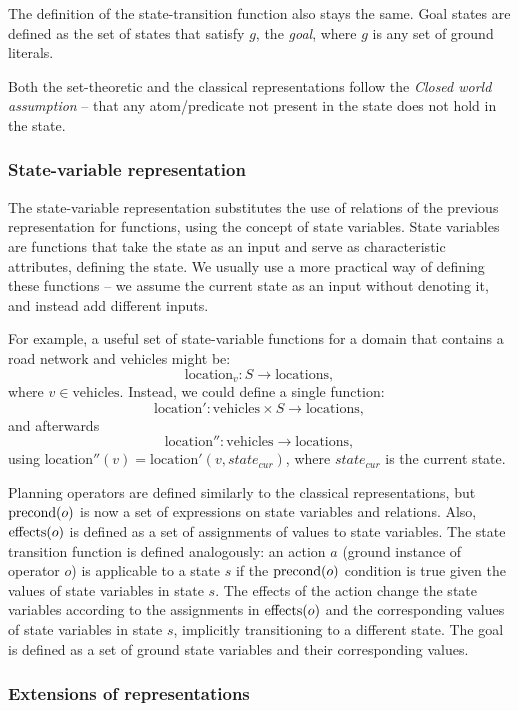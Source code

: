 The definition of the state-transition function also stays the same.
Goal states are defined as the set of states that satisfy $g$,
the \textit{goal}, where $g$ is any set of ground literals.

Both the set-theoretic and the classical representations follow the \textit{Closed world assumption} -- that any atom/predicate not present in the state does not hold in the state.

\subsubsection{State-variable representation}

The state-variable representation substitutes the use of relations of the previous
representation for functions,
using the concept of state variables. State variables are functions
that take the state as an input and serve as characteristic attributes, defining the state. We usually use a more practical way of defining these functions -- we assume
the current state as an input without denoting it, and instead add different inputs.

For example, a useful set of state-variable functions for a domain that contains a road
network and vehicles might be: $$\mathrm{location}_{v}: S \to \mathrm{locations},$$
where $v \in \mathrm{vehicles}$.
Instead, we could define a single function:
$$\mathrm{location'}: \mathrm{vehicles} \times S \to \mathrm{locations},$$
and afterwards 
$$\mathrm{location''}: \mathrm{vehicles} \to \mathrm{locations},$$
using $\mathrm{location''}(v) = \mathrm{location'}(v, state_{cur})$, where $state_{cur}$ is the current state.

Planning operators are defined similarly to the classical representations, but
$\operatorname{\textrm{precond}}(o)$ is now a set of expressions on state variables and relations.
Also, $\operatorname{\textrm{effects}}(o)$ is defined as a set of assignments of values to state variables.
The state transition function is defined analogously: an action $a$ (ground instance
of operator $o$)
is applicable to a state $s$ if the $\operatorname{\textrm{precond}}(o)$ condition is true given the values
of state variables in state $s$. The effects of the action change the state variables
according to the assignments in $\operatorname{\textrm{effects}}(o)$ and the corresponding values of state
variables in state $s$, implicitly transitioning to a different state.
The goal is defined as a set of ground state variables and their corresponding values.
\cite[Section~2.5.2]{Ghallab2004}

\subsubsection{Extensions of representations}

